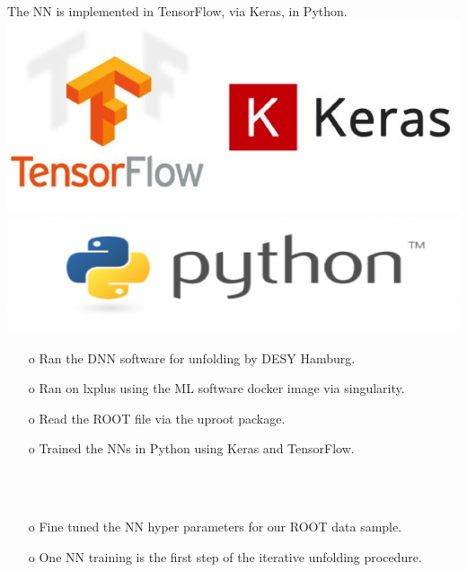 \begin{frame}{The NN is implemented in TensorFlow, via Keras, in Python.}
\centering
\includegraphics[height=0.25\textheight]{./plots/TensorFlow_Keras.png}
\includegraphics[height=0.25\textheight]{./plots/Python.png}
\begin{enumerate}
\item[o] Ran the DNN software for unfolding by DESY Hamburg.
\item[o] Ran on lxplus using the ML software docker image via singularity.
\item[o] Read the ROOT file via the uproot package.
\item[o] Trained  the NNs in Python using Keras and TensorFlow.
\end{enumerate}
\ \\
\ \\
\begin{enumerate}
\item[o] Fine tuned the NN hyper parameters for our ROOT data sample.
\item[o] One NN training is the first step of the iterative unfolding procedure. 
\end{enumerate}
\end{frame}
\clearpage

